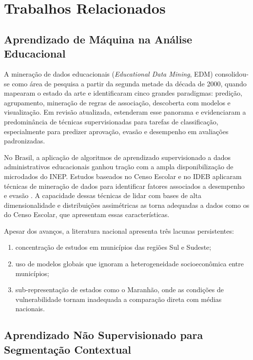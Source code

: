 \chapter{Trabalhos Relacionados}
\label{cap:related}

\section{Aprendizado de Máquina na Análise Educacional}

A mineração de dados educacionais (\textit{Educational Data Mining}, EDM) consolidou-se como área de pesquisa a partir da segunda metade da década de 2000, quando \citet{baker2010} mapearam o estado da arte e identificaram cinco grandes paradigmas: predição, agrupamento, mineração de regras de associação, descoberta com modelos e visualização. Em revisão atualizada, \citet{romero2020} estenderam esse panorama e evidenciaram a predominância de técnicas supervisionadas para tarefas de classificação, especialmente para predizer aprovação, evasão e desempenho em avaliações padronizadas.

No Brasil, a aplicação de algoritmos de aprendizado supervisionado a dados administrativos educacionais ganhou tração com a ampla disponibilização de microdados do INEP. Estudos baseados no Censo Escolar e no IDEB aplicaram técnicas de mineração de dados para identificar fatores associados a desempenho e evasão \cite{colpani2018}. A capacidade dessas técnicas de lidar com bases de alta dimensionalidade e distribuições assimétricas as torna adequadas a dados como os do Censo Escolar, que apresentam essas características.

Apesar dos avanços, a literatura nacional apresenta três lacunas persistentes:

\begin{enumerate}[label=\alph*)]
    \item concentração de estudos em municípios das regiões Sul e Sudeste;
    \item uso de modelos globais que ignoram a heterogeneidade socioeconômica entre municípios;
    \item sub-representação de estados como o Maranhão, onde as condições de vulnerabilidade tornam inadequada a comparação direta com médias nacionais.
\end{enumerate}

\section{Aprendizado Não Supervisionado para Segmentação Contextual}

